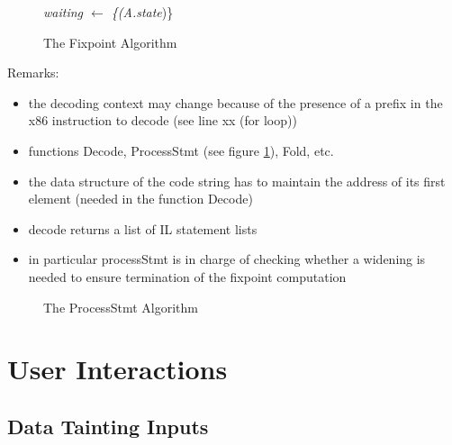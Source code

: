 \documentclass{report}
\begin{document}
\begin{figure}
\begin{algorithm}[H]

\BlankLine
\emph{waiting $\leftarrow$ \{(A.state})\}\;
\end{algorithm}
\caption{The Fixpoint Algorithm}
\end{figure}
Remarks:
  \begin{itemize}
\item the decoding context may change because of the presence of a
  prefix in the x86 instruction to decode (see line xx (for loop))
\item functions Decode, ProcessStmt (see figure \ref{algo:processStmt}), Fold, etc.
\item the data structure of the code string has to maintain the
  address of its first element (needed in the function Decode)
\item decode returns a list of IL statement lists
\item in particular processStmt is in charge of checking whether a
  widening is needed to ensure termination of the fixpoint computation
  \end{itemize}

\begin{figure}
\begin{algorithm}[H]
\end{algorithm}
\caption{The ProcessStmt Algorithm}
\label{algo:processStmt}
\end{figure}
\chapter{User Interactions}
\section{Data Tainting Inputs}
\end{document}
